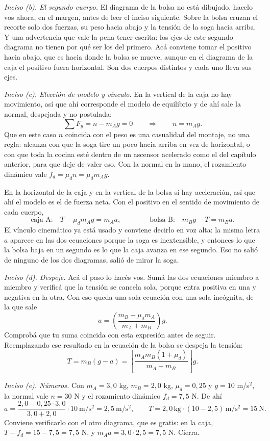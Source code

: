 \documentclass[11pt,openany]{book}
\begin{document}
\begin{ejemplo}[completo]
\medskip
\textit{Inciso (b). El segundo cuerpo.} El diagrama de la bolsa no está dibujado, hacelo vos ahora, en el margen, antes de leer el inciso siguiente. Sobre la bolsa cruzan el recorte solo dos fuerzas, su peso hacia abajo y la tensión de la soga hacia arriba. Y una advertencia que vale la pena tener escrita: los ejes de este segundo diagrama no tienen por qué ser los del primero. Acá conviene tomar el positivo hacia abajo, que es hacia donde la bolsa se mueve, aunque en el diagrama de la caja el positivo fuera horizontal. Son dos cuerpos distintos y cada uno lleva sus ejes.

\medskip
\textit{Inciso (c). Elección de modelo y vínculo.} En la vertical de la caja no hay movimiento, así que ahí corresponde el modelo de equilibrio y de ahí sale la normal, despejada y no postulada:
\[
\sum F_y = n - m_A g = 0 \qquad \Longrightarrow \qquad n = m_A g .
\]
Que en este caso $n$ coincida con el peso es una casualidad del montaje, no una regla: alcanza con que la soga tire un poco hacia arriba en vez de horizontal, o con que toda la cocina esté dentro de un ascensor acelerado como el del capítulo anterior, para que deje de valer eso. Con la normal en la mano, el rozamiento dinámico vale $f_d = \mu_d n = \mu_d m_A g$.

En la horizontal de la caja y en la vertical de la bolsa sí hay aceleración, así que ahí el modelo es el de fuerza neta. Con el positivo en el sentido de movimiento de cada cuerpo,
\[
\text{caja A:} \quad T - \mu_d m_A g = m_A a ,
\qquad\qquad
\text{bolsa B:} \quad m_B g - T = m_B a .
\]
El vínculo cinemático ya está usado y conviene decirlo en voz alta: la misma letra $a$ aparece en las dos ecuaciones porque la soga es inextensible, y entonces lo que la bolsa baja en un segundo es lo que la caja avanza en ese segundo. Eso no salió de ninguno de los dos diagramas, salió de mirar la soga.

\medskip
\textit{Inciso (d). Despeje.} Acá el paso lo hacés vos. Sumá las dos ecuaciones miembro a miembro y verificá que la tensión se cancela sola, porque entra positiva en una y negativa en la otra. Con eso queda una sola ecuación con una sola incógnita, de la que sale
\[
a = \left(\frac{m_B - \mu_d m_A}{m_A + m_B}\right) g .
\]
Comprobá que tu suma coincida con esta expresión antes de seguir. Reemplazando ese resultado en la ecuación de la bolsa se despeja la tensión:
\[
T = m_B (g - a) = \left[\frac{m_A m_B (1 + \mu_d)}{m_A + m_B}\right] g .
\]

\medskip
\textit{Inciso (e). Números.} Con $m_A = 3{,}0$ kg, $m_B = 2{,}0$ kg, $\mu_d = 0{,}25$ y $g = 10$ m/s$^2$, la normal vale $n = 30$ N y el rozamiento dinámico $f_d = 7{,}5$ N. De ahí
\[
a = \frac{2{,}0 - 0{,}25 \cdot 3{,}0}{3{,}0 + 2{,}0} \cdot 10\ \mathrm{m/s^2} = 2{,}5\ \mathrm{m/s^2} ,
\qquad
T = 2{,}0\,\mathrm{kg} \cdot (10 - 2{,}5)\,\mathrm{m/s^2} = 15\ \mathrm{N} .
\]
Conviene verificarlo con el otro diagrama, que es gratis: en la caja, $T - f_d = 15 - 7{,}5 = 7{,}5$ N, y $m_A a = 3{,}0 \cdot 2{,}5 = 7{,}5$ N. Cierra.


\end{ejemplo}
\end{document}
